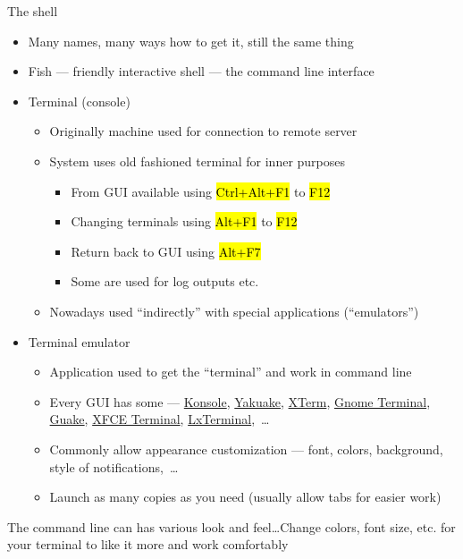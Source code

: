 \documentclass[compress, ucs, xelatex, 11pt, xcolor=svgnames, aspectratio=169,
	hyperref={
		bookmarks=true,
		unicode=true,
		colorlinks=true,
		pdftitle={Linux, command line and MetaCentrum},
		plainpages=false,
		pdfauthor={Vojtech Zeisek},
		pdfsubject={Course about use of Linux command line, writing shell scripts and using MetaCentrum of CESNET},
		pdfcreator={XeLaTeX},
		pdfkeywords={Linux, GNU, BASH, shell, command line, MetaCentrum},
		linkcolor=DarkRed, %
		anchorcolor=DarkBlue, %
		citecolor=Indigo, %
		filecolor=NavyBlue, %
		menucolor=DarkMagenta, %
		urlcolor=DarkBlue, %
		pdftex},
	url={hyphens, lowtilde} %
	]{beamer}
\renewcommand{\texttt}[1]{\hl{\ttfamily #1}}
\begin{document}
\begin{frame}{The shell}
	\begin{itemize}
		\item Many names, many ways how to get it, still the same thing
		\item Fish --- friendly interactive shell --- the command line interface
		\item Terminal (console)
		\begin{itemize}
			\item Originally machine used for connection to remote server
			\item System uses old fashioned terminal for inner purposes
			\begin{itemize}
				\item From GUI available using \texttt{Ctrl+Alt+F1} to \texttt{F12}
				\item Changing terminals using \texttt{Alt+F1} to \texttt{F12}
				\item Return back to GUI using \texttt{Alt+F7}
				\item Some are used for log outputs etc.
			\end{itemize}
			\item Nowadays used \enquote{indirectly} with special applications (\enquote{emulators})
		\end{itemize}
		\item Terminal emulator
		\begin{itemize}
			\item Application used to get the \enquote{terminal} and work in command line
			\item Every GUI has some --- \href{https://konsole.kde.org/}{Konsole}, \href{https://yakuake.kde.org/}{Yakuake}, \href{https://invisible-island.net/xterm/}{XTerm}, \href{https://wiki.gnome.org/Apps/Terminal}{Gnome Terminal}, \href{http://guake.org/}{Guake}, \href{https://docs.xfce.org/apps/terminal/start}{XFCE Terminal}, \href{https://wiki.lxde.org/en/LXTerminal}{LxTerminal},~\ldots
			\item Commonly allow appearance customization --- font, colors, background, style of notifications,~\ldots
			\item Launch as many copies as you need (usually allow tabs for easier work)
		\end{itemize}
	\end{itemize}
\end{frame}

\begin{frame}{The command line can has various look and feel\ldots}{Change colors, font size, etc. for your terminal to like it more and work comfortably}
	\begin{center}
		\texttt{[image: terminals.png]}
	\end{center}
\end{frame}
\end{document}

